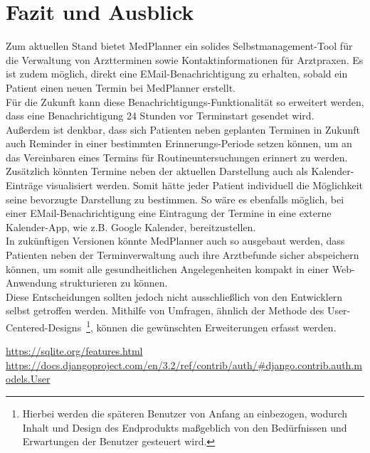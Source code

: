 \documentclass[conference]{IEEEtran}
\begin{document}
\section{Fazit und Ausblick}
Zum aktuellen Stand bietet MedPlanner ein solides Selbstmanagement-Tool für die Verwaltung von Arztterminen sowie Kontaktinformationen für Arztpraxen. Es ist zudem möglich, direkt eine EMail-Benachrichtigung zu erhalten, sobald ein Patient einen neuen Termin bei MedPlanner erstellt.\\
Für die Zukunft kann diese Benachrichtigungs-Funktionalität so erweitert werden, dass eine Benachrichtigung 24 Stunden vor Terminstart gesendet wird.\\
Außerdem ist denkbar, dass sich Patienten neben geplanten Terminen in Zukunft auch Reminder in einer bestimmten Erinnerungs-Periode setzen können, um an das Vereinbaren eines Termins für Routineuntersuchungen erinnert zu werden.\\
Zusätzlich könnten Termine neben der aktuellen Darstellung auch als Kalender-Einträge visualisiert werden. Somit hätte jeder Patient individuell die Möglichkeit seine bevorzugte Darstellung zu bestimmen.
So wäre es ebenfalls möglich, bei einer EMail-Benachrichtigung eine Eintragung der Termine in eine externe Kalender-App, wie z.B. Google Kalender, bereitzustellen.\\
In zukünftigen Versionen könnte MedPlanner auch so ausgebaut werden, dass Patienten neben der Terminverwaltung auch ihre Arztbefunde sicher abspeichern können, um somit alle gesundheitlichen Angelegenheiten kompakt in einer Web-Anwendung strukturieren zu können.\\
Diese Entscheidungen sollten jedoch nicht ausschließlich von den Entwicklern selbst getroffen werden. Mithilfe von Umfragen, ähnlich der Methode des User-Centered-Designs~\footnote{Hierbei werden die späteren Benutzer von Anfang an einbezogen, wodurch Inhalt und Design des Endprodukts maßgeblich von den Bedürfnissen und Erwartungen der Benutzer gesteuert wird.}, können die gewünschten Erweiterungen erfasst werden.

\begin{thebibliography}{00}
 \url{https://sqlite.org/features.html}
 \url{https://docs.djangoproject.com/en/3.2/ref/contrib/auth/#django.contrib.auth.models.User}
\end{thebibliography}
\end{document}
